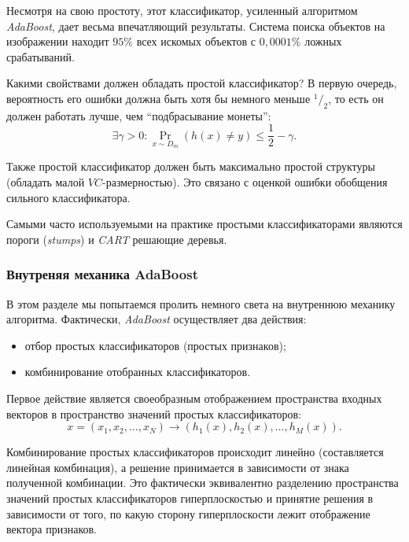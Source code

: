 Несмотря на свою простоту, этот классификатор, усиленный алгоритмом \emph{AdaBoost}, дает весьма впечатляющий результаты. Система поиска объектов на изображении \cite{viola01} находит $95\%$ всех искомых объектов с $0,0001\%$ ложных срабатываний.

Какими свойствами должен обладать простой классификатор? В первую очередь, вероятность его ошибки должна быть хотя бы немного меньше $^1/_2$, то есть он должен работать лучше, чем ``подбрасывание монеты'':
\begin{displaymath}
  \exists \gamma > 0: \underset{x \sim D_m}{\Pr}(h(x) \neq y) \leq \frac{1}{2} - \gamma.
\end{displaymath}

Также простой классификатор должен быть максимально простой структуры (обладать малой $VC$-размерностью). Это связано с оценкой ошибки обобщения сильного классификатора.

Самыми часто используемыми на практике простыми классификаторами являются пороги (\emph{stumps}) и \emph{CART} решающие деревья.

\subsubsection{Внутреняя механика AdaBoost}

В этом разделе мы попытаемся пролить немного света на внутреннюю механику алгоритма. Фактически, \emph{AdaBoost} осуществляет два действия:
\begin{itemize}
  \item отбор простых классификаторов (простых признаков);
  \item комбинирование отобранных классификаторов.
\end{itemize}

Первое действие является своеобразным отображением пространства входных векторов в пространство значений простых классификаторов:
\begin{displaymath}
  x = (x_1, x_2, \dots, x_N) \to (h_1(x), h_2(x), \dots, h_M(x)).
\end{displaymath}

Комбинирование простых классификаторов происходит линейно (составляется линейная комбинация), а решение принимается в зависимости от знака полученной комбинации. Это фактически эквивалентно разделению пространства значений простых классификаторов гиперплоскостью и принятие решения в зависимости от того, по какую сторону гиперплоскости лежит отображение вектора признаков.

